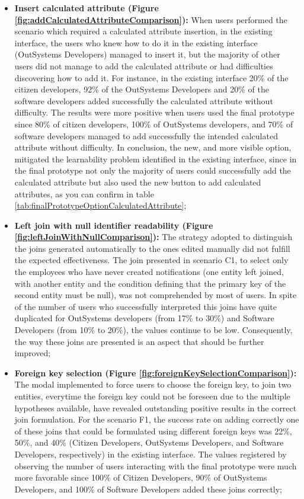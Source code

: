 \begin{itemize}
  \item \textbf{Insert calculated attribute (Figure \ref{fig:addCalculatedAttributeComparison}): } When users performed the scenario which required a calculated attribute insertion, in the existing interface, the users who knew how to do it in the existing interface (OutSystems Developers) managed to insert it, but the majority of other users did not manage to add the calculated attribute or had difficulties discovering how to add it. For instance, in the existing interface 20\% of the citizen developers, 92\% of the OutSystems Developers and 20\% of the software developers added successfully the calculated attribute without difficulty. The results were more positive when users used the final prototype since 80\% of citizen developers, 100\% of OutSystems developers, and 70\% of software developers managed to add successfully the intended calculated attribute without difficulty. In conclusion, the new, and more visible option, mitigated the learnability problem identified in the existing interface, since in the final prototype not only the majority of users could successfully add the calculated attribute but also used the new button to add calculated attributes, as you can confirm in table \ref{tab:finalPrototypeOptionCalculatedAttribute};
  \item \textbf{Left join with null identifier readability (Figure \ref{fig:leftJoinWithNullComparison}): } The strategy adopted to distinguish the joins generated automatically to the ones edited manually did not fulfill the expected effectiveness. The join presented in scenario C1, to select only the employees who have never created notifications (one entity left joined, with another entity and the condition defining that the primary key of the second entity must be null), was not comprehended by most of users. In spite of the number of users who successfully interpreted this joins have quite duplicated for OutSystems developers (from 17\% to 30\%) and Software Developers (from 10\% to 20\%), the values continue to be low. Consequently, the way these joins are presented is an aspect that should be further improved;
  \item \textbf{Foreign key selection (Figure \ref{fig:foreignKeySelectionComparison}): } The modal implemented to force users to choose the foreign key, to join two entities, everytime the foreign key could not be foreseen due to the multiple hypotheses available, have revealed outstanding positive results in the correct join formulation. For the scenario F1, the success rate on adding correctly one of these joins that could be formulated using different foreign keys was 22\%, 50\%, and 40\% (Citizen Developers, OutSystems Developers, and Software Developers, respectively) in the existing interface. The values registered by observing the number of users interacting with the final prototype were much more favorable since 100\% of Citizen Developers, 90\% of OutSystems Developers, and 100\% of Software Developers added these joins correctly;

\end{itemize}

